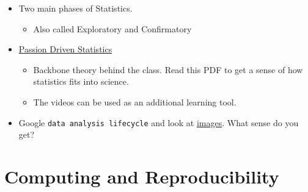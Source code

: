 \documentclass[]{article}
\providecommand{\tightlist}{%
  \setlength{\itemsep}{0pt}\setlength{\parskip}{0pt}}
\begin{document}
\begin{itemize}
\tightlist
\item
  Two main phases of Statistics.

  \begin{itemize}
  \tightlist
  \item
    Also called Exploratory and Confirmatory
  \end{itemize}
\item
  \href{../reading/PDS_Intro_Stat.pdf}{Passion Driven Statistics}

  \begin{itemize}
  \tightlist
  \item
    Backbone theory behind the class. Read this PDF to get a sense of
    how statistics fits into science.
  \item
    The videos can be used as an additional learning tool.
  \end{itemize}
\item
  Google \texttt{data\ analysis\ lifecycle} and look at
  \href{https://www.google.com/search?q=data+analytics+life+cycle\&newwindow=1\&source=lnms\&tbm=isch\&sa=X\&ved=0ahUKEwi32cepp9DcAhXLhVQKHYR8AScQ_AUICigB\&biw=1482\&bih=876}{images}.
  What sense do you get?
\end{itemize}

\section{Computing and
Reproducibility}\label{computing-and-reproducibility}
\end{document}
